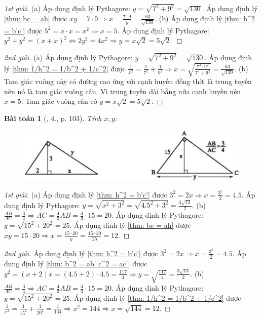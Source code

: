 \documentclass{article}
\newtheorem{baitoan}{Bài toán}
\begin{document}
\begin{proof}[1st giải]
	(a) Áp dụng định lý Pythagore: $y = \sqrt{7^2 + 9^2} = \sqrt{130}$. Áp dụng định lý \ref{thm: bc = ah} được $xy = 7\cdot 9\Rightarrow x = \frac{7\cdot9}{y} = \frac{63}{\sqrt{130}}$. (b) Áp dụng định lý \ref{thm: h^2 = b'c'} được $5^2 = x\cdot x = x^2\Rightarrow x = 5$. Áp dụng định lý Pythagore: $y^2 + y^2 = (x + x)^2\Leftrightarrow 2y^2 = 4x^2\Rightarrow y = x\sqrt{2} = 5\sqrt{2}$.
\end{proof}

\begin{proof}[2nd giải]
	(a) Áp dụng định lý Pythagore: $y = \sqrt{7^2 + 9^2} = \sqrt{130}$. Áp dụng định lý \ref{thm: 1/h^2 = 1/b^2 + 1/c^2} được $\frac{1}{x^2} = \frac{1}{7^2} + \frac{1}{9^2}\Rightarrow x = \sqrt{\frac{7^2\cdot9^2}{7^2 + 9^2}} = \frac{63}{\sqrt{130}}$. (b) Tam giác vuông này có đường cao ứng với cạnh huyền đồng thời là trung tuyến nên nó là tam giác vuông cân. Vì trung tuyến dài bằng nửa cạnh huyền nên $x = 5$. Tam giác vuông cân có $y = x\sqrt{2} = 5\sqrt{2}$.
\end{proof}

\begin{baitoan}[\cite{SBT_Toan_9_tap_1}, 4., p. 103]
	Tính $x,y$:
	\begin{figure}[H]
		\centering
		\includegraphics[scale=.25]{SBT_Toan_9_4_p103}
	\end{figure}
\end{baitoan}

\begin{proof}[1st giải]
	(a) Áp dụng định lý \ref{thm: h^2 = b'c'} được $3^2 = 2x\Rightarrow x = \frac{3^2}{2} = 4.5$. Áp dụng định lý Pythagore: $y = \sqrt{x^2 + 3^2} = \sqrt{4.5^2 + 3^2} = \frac{3\sqrt{13}}{2}$. (b) $\frac{AB}{AC} = \frac{3}{4}\Rightarrow AC = \frac{4}{3}AB = \frac{4}{3}\cdot15 = 20$. Áp dụng định lý Pythagore: $y = \sqrt{15^2 + 20^2} = 25$. Áp dụng định lý \ref{thm: bc = ah} được $xy = 15\cdot20\Rightarrow x = \frac{15\cdot20}{y} = \frac{15\cdot20}{25} = 12$.
\end{proof}

\begin{proof}[2nd giải]
	Áp dụng định lý \ref{thm: h^2 = b'c'} được $3^2 = 2x\Rightarrow x = \frac{3^2}{2} = 4.5$. Áp dụng định lý \ref{thm: b^2 = ab' c^2 = ac'} được $y^2 = (x + 2)x = (4.5 + 2)\cdot4.5 = \frac{117}{4}\Rightarrow y = \sqrt{\frac{117}{4}} = \frac{3\sqrt{13}}{2}$. (b) $\frac{AB}{AC} = \frac{3}{4}\Rightarrow AC = \frac{4}{3}AB = \frac{4}{3}\cdot15 = 20$. Áp dụng định lý Pythagore: $y = \sqrt{15^2 + 20^2} = 25$. Áp dụng định lý \ref{thm: 1/h^2 = 1/b^2 + 1/c^2} được $\frac{1}{x^2} = \frac{1}{15^2} + \frac{1}{20^2} = \frac{1}{144}\Rightarrow x^2 = 144\Rightarrow x = \sqrt{144} = 12$.
\end{proof}
\end{document}
